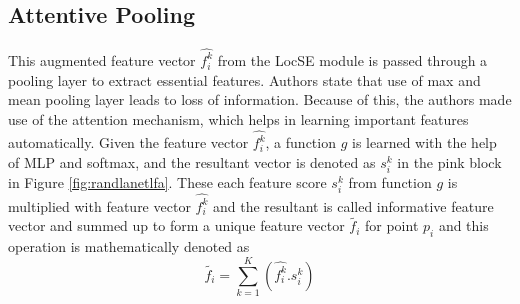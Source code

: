\subsection{Attentive Pooling}
This augmented feature vector $\hat{f_i^k}$ from the LocSE module is passed through a pooling layer to extract essential features.
Authors state that use of max and mean pooling layer leads to loss of information. Because of this, the authors made use of the attention mechanism, which helps in learning important features automatically.
Given the feature vector $\hat{f_i^k}$, a function $g$ is learned with the help of MLP and softmax, and the resultant vector is denoted as $s_i^k$ in the pink block in Figure \ref{fig:randlanetlfa}.
These each feature score $s_i^k$ from function $g$ is multiplied with feature vector $\hat{f_i^k}$ and the resultant is called informative feature vector and summed up to form a unique feature vector $\tilde{f_i}$ for point $p_i$ and this operation is mathematically denoted as
$$
\tilde{f_i}= \sum_{k=1}^K (\hat{f_i^k}.s_i^k)
$$

